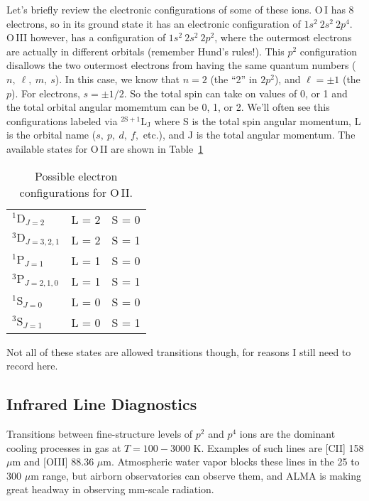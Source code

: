 \documentclass[10pt]{article}
\numberwithin{equation}{section}
\newcommand{\n}{\noindent}
\begin{document}
\n Let's briefly review the electronic configurations of some of these ions.
O\,I has 8 electrons, so in its ground state it has an electronic configuration
of $1s^2\ 2s^2\ 2p^4$. O\,III however, has a configuration of $1s^2\ 2s^2\
2p^2$, where the outermost electrons are actually in different orbitals
(remember Hund's rules!). This $p^2$ configuration disallows the two outermost
electrons from having the same quantum numbers ($n,\ \ell,\ m,\ s$). In this
case, we know that $n=2$ (the ``2'' in $2p^2$), and $\ell=\pm1$ (the $p$). For
electrons, $s = \pm 1/2$. So the total spin can take on values of 0, or 1 and
the total orbital angular momemtum can be 0, 1, or 2. We'll often see this
configurations labeled via $\mathrm{^{2S+1}L_J}$ where S is the total spin
angular momentum, L is the orbital name ($s,\ p,\ d,\ f,$ etc.), and J is the
total angular momentum. The available states for O\,II are shown in
Table~\ref{tab:oii}
\begin{table}
  \centering
  \begin{tabular}{l l l}
    $^1\mathrm{D}_{J=2}$ & L = 2 & S = 0\\
    $^3\mathrm{D}_{J=3,2,1}$ & L = 2 & S = 1 \\
    $^1\mathrm{P}_{J=1}$ & L = 1 & S = 0\\
    $^3\mathrm{P}_{J=2,1,0}$ & L = 1 & S = 1\\
    $^1\mathrm{S}_{J=0}$ & L = 0 & S = 0\\
    $^3\mathrm{S}_{J=1}$ & L = 0 & S = 1
  \end{tabular}
  \caption{Possible electron configurations for O\,II.}
  \label{tab:oii}
\end{table}
  Not all of these states are allowed transitions though, for reasons I still
  need to record here.

\subsection{Infrared Line Diagnostics} %
\label{sub:infrared_line_diagnostics}
Transitions between fine-structure levels of $p^2$ and $p^4$ ions are the
dominant cooling processes in gas at $T = 100-3000$ K. Examples of such lines
are [CII] 158 $\mu$m and [OIII] 88.36 $\mu$m. Atmospheric water vapor blocks
these lines in the 25 to 300 $\mu$m range, but airborn observatories can
observe them, and ALMA is making great headway in observing mm-scale
radiation.\\
\end{document}
